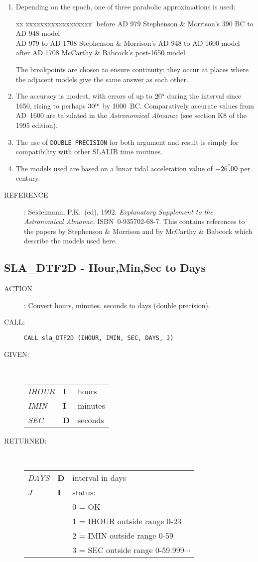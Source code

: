 \documentclass[11pt,twoside]{article}
\newcommand{\xlabel}[1]{}
\newcommand{\arcsec}[2] {\arcseci{#1}$\hspace{-0.4em}.#2$}
\newcommand{\arcsec}[2] {
      {$#1\hspace{-0.05em}^{'\hspace{-0.1em}'}\hspace{-0.4em}.#2$}
   }
\newcommand{\arcseci}[1] {$#1\hspace{-0.05em}$\raisebox{-0.5ex}
                         {$^{'\hspace{-0.1em}'}$}}
\renewcommand{\arcseci}[1] {$#1\hspace{-0.05em}^{'\hspace{-0.1em}'}$}
\newcommand{\routine}[3]
{\hbadness=10000
  \vbox
  {
    \rule{\textwidth}{0.3mm}\\
    {\Large {\bf #1} \hfill #2 \hfill {\bf #1}}\\
    \setlength{\oldspacing}{\topsep}
    \setlength{\topsep}{0.3ex}
    \begin{description}
      #3
    \end{description}
    \setlength{\topsep}{\oldspacing}
  }
}
\renewcommand{\routine}[3]
   {
      \subsection{#1\xlabel{#1} - #2\label{#1}}
       \begin{description}
         #3
       \end{description}
   }
\newcommand{\action}[1]
{\item[ACTION]: #1}
\newcommand{\action}[1]
   {\item[ACTION:] #1}
\newcommand{\call}[1]
{\item[CALL]: \hspace{0.4em}{\tt #1}}
\newlength{\oldspacing}
\renewcommand{\call}[1]
   {
    \item[CALL:] {\tt #1}
   }
\newcommand{\args}[2]
{
  \goodbreak
  \setlength{\oldspacing}{\topsep}
  \setlength{\topsep}{0.3ex}
  \begin{description}
  \item[#1]:\\[1.5ex]
    \begin{tabular}{p{7em}p{6em}p{22em}}
      #2
    \end{tabular}
  \end{description}
  \setlength{\topsep}{\oldspacing}
}
\renewcommand{\args}[2]
   {
     \begin{description}
        \item[#1:]\\
        \begin{tabular}{p{7em}p{6em}l}
           #2
        \end{tabular}
     \end{description}
   }
\newcommand{\spec}[3]
{
  {\em {#1}} & {\bf \mbox{#2}} & {#3}
}
\newcommand{\aref}[1]
{
  \goodbreak
  \setlength{\oldspacing}{\topsep}
  \setlength{\topsep}{0.3ex}
  \begin{description}
    \item[REFERENCE]:
        #1
  \end{description}
  \setlength{\topsep}{\oldspacing}
}
\newcommand{\aref}[1]
   {
     \begin{description}
       \item[REFERENCE:]
           #1
     \end{description}
   }
\begin{document}
{
 \begin{enumerate}
  \item Depending on the epoch, one of three parabolic approximations
        is used:
\begin{tabbing}
xx \= xxxxxxxxxxxxxxxxxx \= \kill
\> before AD 979 \> Stephenson \& Morrison's 390 BC to AD 948 model \\
\> AD 979 to AD 1708 \> Stephenson \& Morrison's AD 948 to AD 1600 model \\
\> after AD 1708 \> McCarthy \& Babcock's post-1650 model
\end{tabbing}
        The breakpoints are chosen to ensure continuity:  they occur
        at places where the adjacent models give the same answer as
        each other.
  \item The accuracy is modest, with errors of up to $20^{\rm s}$ during
        the interval since 1650, rising to perhaps $30^{\rm m}$
        by 1000~BC.  Comparatively accurate values from AD~1600
        are tabulated in
        the {\it Astronomical Almanac}\/ (see section K8 of the 1995
        edition).
  \item The use of {\tt DOUBLE PRECISION} for both argument and result is
        simply for compatibility with other SLALIB time routines.
  \item The models used are based on a lunar tidal acceleration value
        of \arcsec{-26}{00} per century.
 \end{enumerate}
}
\aref{Seidelmann, P.K.\ (ed), 1992.  {\it Explanatory
      Supplement to the Astronomical Almanac,}\/ ISBN~0-935702-68-7.
      This contains references to the papers by Stephenson \& Morrison
      and by McCarthy \& Babcock which describe the models used here.}
\routine{SLA\_DTF2D}{Hour,Min,Sec to Days}
{
 \action{Convert hours, minutes, seconds to days (double precision).}
 \call{CALL sla\_DTF2D (IHOUR, IMIN, SEC, DAYS, J)}
}
\args{GIVEN}
{
 \spec{IHOUR}{I}{hours} \\
 \spec{IMIN}{I}{minutes} \\
 \spec{SEC}{D}{seconds}
}
\args{RETURNED}
{
 \spec{DAYS}{D}{interval in days} \\
 \spec{J}{I}{status:} \\
 \spec{}{}{\hspace{1.5em} 0 = OK} \\
 \spec{}{}{\hspace{1.5em} 1 = IHOUR outside range 0-23} \\
 \spec{}{}{\hspace{1.5em} 2 = IMIN outside range 0-59} \\
 \spec{}{}{\hspace{1.5em} 3 = SEC outside range 0-59.999$\cdots$}
}
\end{document}
